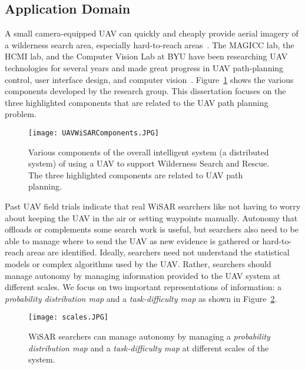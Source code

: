 \subsection{Application Domain}

A small camera-equipped UAV can quickly and cheaply provide aerial imagery of a wilderness search area, especially hard-to-reach areas~\cite{Goodrich2008Supporting}. The MAGICC lab, the HCMI lab, and the Computer Vision Lab at BYU have been researching UAV technologies for several years and made great progress in UAV path-planning control, user interface design, and computer vision~\cite{Lin2010Supporting}. Figure~\ref{SystemComponents} shows the various components developed by the research group. This dissertation focuses on the three highlighted components that are related to the UAV path planning problem.

\begin{figure}
\centering
\texttt{[image: UAVWiSARComponents.JPG]}
\caption{Various components of the overall intelligent system (a distributed system) of using a UAV to support Wilderness Search and Rescue. The three highlighted components are related to UAV path planning.}
\label{SystemComponents}
\end{figure}

Past UAV field trials indicate that real WiSAR searchers like not having to worry about keeping the UAV in the air or setting waypoints manually. Autonomy that offloads or complements some search work is useful, but searchers also need to be able to manage where to send the UAV as new evidence is gathered or hard-to-reach areas are identified. Ideally, searchers need not understand the statistical models or complex algorithms used by the UAV. Rather, searchers should manage autonomy by managing information provided to the UAV system at different scales. We focus on two important representations of information: a \textit{probability distribution map} and a \textit{task-difficulty map} as shown in Figure~\ref{Scales}.

\begin{figure}
\centering
\texttt{[image: scales.JPG]}
\caption{WiSAR searchers can manage autonomy by managing a \textit{probability distribution map} and a \textit{task-difficulty map} at different scales of the system.}
\label{Scales}
\end{figure}

